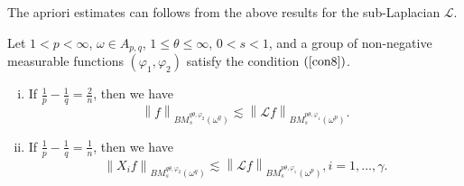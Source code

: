 \documentclass[11pt, twoside, leqno]{article}
\begin{document}
The apriori estimates can follows from the above results for the sub-Laplacian $\mathcal L$.
\begin{thm}
	Let $1 < p < \infty$, $\omega  \in {A_{p,q}}$, $1 \le \theta  \le \infty$, $0 < s < 1$, and a group of non-negative measurable functions $({{\varphi }_1},{\varphi _2})$ satisfy the condition $(\ref{con8})$.
	\begin{enumerate}[(i)]
		\item If $\frac{1}{p} - \frac{1}{q} = \frac{2}{n}$, then we have 
		\begin{equation*}
		{\left\| f \right\|_{BM_s^{q\theta ,{\varphi _2}}({\omega ^q})}} \lesssim {\left\| {{\mathcal L}f} \right\|_{BM_s^{p\theta ,{\varphi _1}}({\omega ^p})}}.
		\end{equation*}
		\item If $\frac{1}{p} - \frac{1}{q} = \frac{1}{n}$, then we have	
		\begin{equation*}
		{\left\| {{X_i}f} \right\|_{BM_s^{q\theta ,{\varphi _2}}({\omega ^q})}} \lesssim {\left\| {{\mathcal L}f} \right\|_{BM_s^{p\theta ,{\varphi _1}}({\omega ^p})}}, i = 1, \ldots ,\gamma.
		\end{equation*}
	\end{enumerate}
\end{thm}
\end{document}
